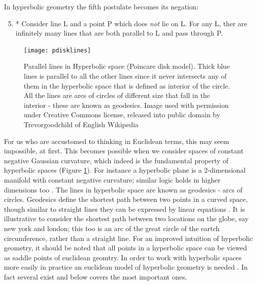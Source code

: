 \documentclass[12pt]{report}
\begin{document}
In hyperbolic geometry the fifth postulate becomes its negation: 

\begin{enumerate}
   \setcounter{enumi}{4}
   \item * Consider line L and a point P which does \textit{not} lie on L. For any L, ther are infinitely many lines that are both parallel to L and pass through P.
 \end{enumerate}

\begin{figure}
  \centering
	\texttt{[image: pdisklines]}
	\caption{Parallel lines in Hyperbolic space (Poincare disk model). Thick blue lines is parallel to all the other lines since it never intersects any of them in the hyperbolic space that is defined as interior of the circle. All the lines are arcs of circles of different size that fall in the interior - these are known as geodesics. Image used with permission under Creative Commons license, released into public domain by Trevorgoodchild of English Wikipedia}
	\label{fig:disklines}
\end{figure}

For us who are accustomed to thinking in Euclidean terms, this may seem impossible, at first. This becomes possible when we consider spaces of constant negative Gaussian curvature, which indeed is the fundamental property of hyperbolic spaces (Figure \ref{fig:disklines}). For instance a hyperbolic plane is a 2-dimensional manifold with constant negative curvature; similar logic holds in higher dimensions too \cite{Stillwell1991}. The lines in hyperbolic space are known as geodesics - arcs of circles. Geodesics define the shortest path between two points in a curved space, though similar to straight lines they can be expressed by linear equations \cite{Stillwell1991}. It is illustrative to consider the shortest path between two locations on the globe, say new york and london; this too is an arc of the great circle of the eartch circumference, rather than a straight line. For an improved intuition of hyperbolic geometry, it should be noted that all points in a hyperbolic space can be viewed as saddle points of euclidean geomtry. In order to work with hyperbolic spaces more easily in practice an euclidean model of hyperbolic geometry is needed \cite{Greenberg1994}. In fact several exist and below covers the most important ones.
\end{document}
